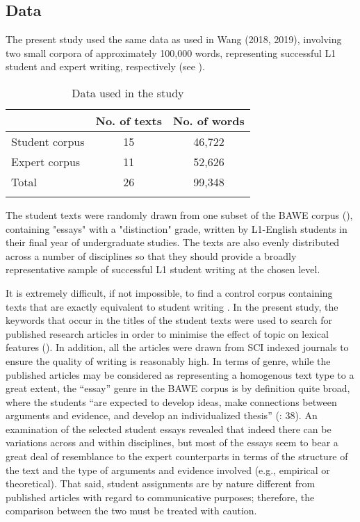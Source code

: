 \documentclass[output=paper]{langscibook}
\begin{document}
\subsection{Data}\label{sec:wang:2.1}

The present study used the same data as used in Wang (2018, 2019), involving two small corpora of approximately 100,000 words, representing successful L1 student and expert writing, respectively (see ). 


\begin{table}
\begin{tabular}{lcc} 
\lsptoprule
& No. of texts & No. of words\\\midrule
Student corpus & 15 & 46,722\\
Expert corpus  & 11 & 52,626\\
Total          & 26 & 99,348\\
\lspbottomrule
\end{tabular}
\caption{Data used in the study\label{tab:wang:1}}
\end{table}

The student texts were randomly drawn from one subset of the BAWE corpus (\citealt{NesiGardner2012}), containing "essays" with a "distinction" grade, written by L1-English students in their final year of undergraduate studies.
The texts are also evenly distributed across a number of disciplines so that they should provide a broadly representative sample of successful L1 student writing at the chosen level. 

It is extremely difficult, if not impossible, to find a control corpus containing texts that are exactly equivalent to student writing \citep{Callies2015}. In the present study, the keywords that occur in the titles of the student texts were used to search for published research articles in order to minimise the effect of topic on lexical features (\citealt{CainesButtery2017}). In addition, all the articles were drawn from SCI indexed journals to ensure the quality of writing is reasonably high. In terms of genre, while the published articles may be considered as representing a homogenous text type to a great extent, the ``essay'' genre in the BAWE corpus is by definition quite broad, where the students “are expected to develop ideas, make connections between arguments and evidence, and develop an individualized thesis” (\citealt{NesiGardner2012}: 38). An examination of the selected student essays revealed that indeed there can be variations across and within disciplines, but most of the essays seem to bear a great deal of resemblance to the expert counterparts in terms of the structure of the text and the type of arguments and evidence involved (e.g., empirical or theoretical). That said, student assignments are by nature different from published articles with regard to communicative purposes; therefore, the comparison between the two must be treated with caution. 
\end{document}
